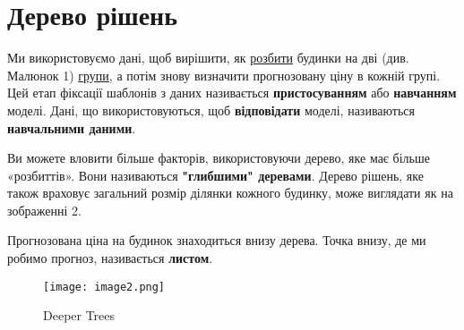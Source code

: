 \chapter{Дерево рішень}\label{cha:decision_tree}
Ми використовуємо дані, щоб вирішити, як \underline{розбити} будинки на дві (див. Малюнок 1) \underline{групи}, а потім знову визначити прогнозовану ціну в кожній групі.
Цей етап фіксації шаблонів з даних називається \textbf{пристосуванням} або \textbf{навчанням} моделі.
Дані, що використовуються, щоб \textbf{відповідати} моделі, називаються \textbf{навчальними даними}.

Ви можете вловити більше факторів, використовуючи дерево, яке має більше «розбиттів».
Вони називаються \textbf{"глибшими" деревами}.
Дерево рішень, яке також враховує загальний розмір ділянки кожного будинку, може виглядати як на зображенні 2.

Прогнозована ціна на будинок знаходиться внизу дерева.
Точка внизу, де ми робимо прогноз, називається \textbf{листом}.

\begin{figure}
    \label{fig:image2}
    \centering
    \texttt{[image: image2.png]}

    Deeper Trees
\end{figure}

